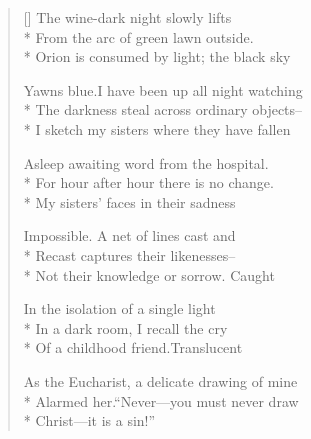 \label{ch:easter}
\settowidth{\versewidth}{Yawns blue.\qquad I have been up all night watching}
\begin{verse}[\versewidth]
The wine-dark night slowly lifts\\*
From the arc of green lawn outside.\\*
Orion is consumed by light; the black sky

Yawns blue.\qquad I have been up all night watching\\*
The darkness steal across ordinary objects--\\*
I sketch my sisters where they have fallen

Asleep awaiting word from the hospital.\\*
For hour after hour there is no change.\\*
My sisters' faces in their sadness

Impossible. A net of lines cast and\\*
Recast captures their likenesses--\\*
Not their knowledge or sorrow. Caught

In the isolation of a single light\\*
In a dark room, I recall the cry\\*
Of a childhood friend.\qquad Translucent

As the Eucharist, a delicate drawing of mine\\*
Alarmed her.\qquad ``Never---you must never draw\\*
Christ---it is a sin!''
\end{verse}
